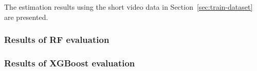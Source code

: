 

%
The estimation results using the short video data in Section~\ref{sec:train-dataset} are presented.

\subsubsection{Results of RF evaluation}


\subsubsection{Results of XGBoost evaluation}

